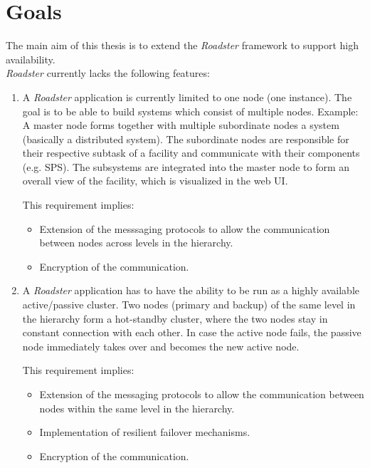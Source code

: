 \documentclass[a4paper]{article}
\begin{document}
\section{Goals}
The main aim of this thesis is to extend the \emph{Roadster} framework to
support high availability.\\

\emph{Roadster} currently lacks the following features:

\begin{enumerate}
	\item A \emph{Roadster} application is currently limited to one node
		(one instance). The goal is to be able to build systems which
		consist of multiple nodes. Example: A master node forms
		together with multiple subordinate nodes a system (basically a
		distributed system). The subordinate nodes are responsible for
		their respective subtask of a facility and communicate with
		their components (e.g. SPS). The subsystems are integrated into
		the master node to form an overall view of the facility, which
		is visualized in the web UI.

This requirement implies:

\begin{itemize}
	\item Extension of the messsaging protocols to allow the communication
		between nodes across levels in the hierarchy.

	\item Encryption of the communication.
\end{itemize}

\item A \emph{Roadster} application has to have the ability to be run as a
	highly available active/passive cluster. Two nodes (primary and backup)
	of the same level in the hierarchy form a hot-standby cluster, where
	the two nodes stay in constant connection with each other. In case the
	active node fails, the passive node immediately takes over and becomes
	the new active node.

This requirement implies:

\begin{itemize}
	\item Extension of the messaging protocols to allow the communication
		between nodes within the same level in the hierarchy.

	\item Implementation of resilient failover mechanisms.

	\item Encryption of the communication.
\end{itemize}



\end{enumerate}
\end{document}
